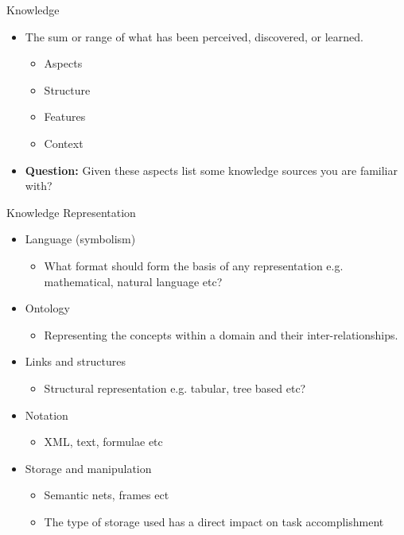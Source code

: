 \documentclass[%
pdf,
colorBG,
slideColor,
tcrico,
]{prosper}
\begin{document}
\begin{slide}{Knowledge}
\begin{itemize}
 \item The sum or range of what has been perceived, discovered, or learned.
\begin{itemize}
 \item Aspects
 \item Structure 
\item Features
\item Context
\end{itemize}
\item \textbf{Question:} Given these aspects list some knowledge sources you are familiar with?
\end{itemize}
\end{slide}


\begin{slide}{Knowledge Representation}
\tiny
\begin{itemize}
 \item  Language (symbolism)
	\begin{itemize}
	\item What format should form the basis of any representation e.g. mathematical, natural language etc?
	\end{itemize}
\item Ontology 
	\begin{itemize}
	\item Representing the concepts within a domain and their inter-relationships.
	\end{itemize}
\item Links and structures
	\begin{itemize}
	\item Structural representation e.g. tabular, tree based etc?
	\end{itemize}
\item Notation
	\begin{itemize}
	\item XML, text, formulae etc 
	\end{itemize}
\item Storage and manipulation
	\begin{itemize}
	\item Semantic nets, frames ect 
	\item The type of storage used has a direct impact on task accomplishment
	\end{itemize}
\end{itemize}
\end{slide}
\end{document}

